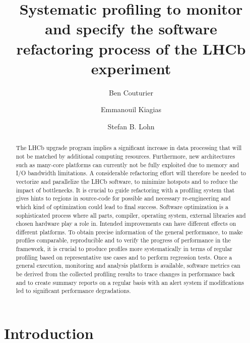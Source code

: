 \documentclass[a4paper]{jpconf}
\begin{document}
\title{Systematic profiling to monitor and specify the software refactoring process of the LHCb experiment}

\author{Ben Couturier}
\address{CERN, CH-1211 Geneva 23, Switzerland}

\author{Emmanouil Kiagias}
\address{University of Athens, Greece}

\author{Stefan B. Lohn}
\address{CERN, CH-1211 Geneva 23, Switzerland}

\begin{abstract}
The LHCb upgrade program implies a significant increase in data processing that will not be matched by additional computing resources. Furthermore, new architectures such as many-core platforms can currently not be fully exploited due to memory and I/O bandwidth limitations. A considerable refactoring effort will therefore be needed to vectorize and parallelize the LHCb software, to minimize hotspots and to reduce the impact of bottlenecks. It is crucial to guide refactoring with a profiling system that gives hints to regions in source-code for possible and necessary re-engineering and which kind of optimization could lead to final success.
\newline
Software optimization is a sophisticated process where all parts, compiler, operating system, external libraries and chosen hardware play a role in. Intended improvements can have different effects on different platforms. To obtain precise information of the general performance, to make profiles comparable, reproducible and to verify the progress of performance in the framework, it is crucial to produce profiles more systematically in terms of regular profiling based on representative use cases and to perform regression tests. Once a general execution, monitoring and analysis platform is available, software metrics can be derived from the collected profiling results to trace changes in performance back and to create summary reports on a regular basis with an alert system if modifications led to significant performance degradations.
\end{abstract}

\section{Introduction}
\label{sec:introduction}
\end{document}
